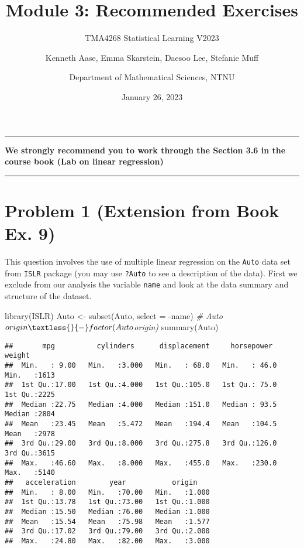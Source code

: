 \documentclass[
]{article}
\title{Module 3: Recommended Exercises}
\subtitle{TMA4268 Statistical Learning V2023}
\author{Kenneth Aase, Emma Skarstein, Daesoo Lee, Stefanie
Muff \and Department of Mathematical Sciences, NTNU}
\date{January 26, 2023}
\newenvironment{Shaded}{\begin{snugshade}}{\end{snugshade}}
\newcommand{\AttributeTok}[1]{\textcolor[rgb]{0.77,0.63,0.00}{#1}}
\newcommand{\CommentTok}[1]{\textcolor[rgb]{0.56,0.35,0.01}{\textit{#1}}}
\newcommand{\FunctionTok}[1]{\textcolor[rgb]{0.00,0.00,0.00}{#1}}
\newcommand{\NormalTok}[1]{#1}
\newcommand{\OtherTok}[1]{\textcolor[rgb]{0.56,0.35,0.01}{#1}}
\newcommand{\SpecialCharTok}[1]{\textcolor[rgb]{0.00,0.00,0.00}{#1}}
\begin{document}
\maketitle

\begin{center}\rule{0.5\linewidth}{0.5pt}\end{center}

\textbf{We strongly recommend you to work through the Section 3.6 in the
course book (Lab on linear regression)}

\begin{center}\rule{0.5\linewidth}{0.5pt}\end{center}

\hypertarget{problem-1-extension-from-book-ex.-9}{%
\section{Problem 1 (Extension from Book Ex.
9)}\label{problem-1-extension-from-book-ex.-9}}

This question involves the use of multiple linear regression on the
\texttt{Auto} data set from \texttt{ISLR} package (you may use
\texttt{?Auto} to see a description of the data). First we exclude from
our analysis the variable \texttt{name} and look at the data summary and
structure of the dataset.

\begin{Shaded}
\begin{Highlighting}[]
\FunctionTok{library}\NormalTok{(ISLR)}
\NormalTok{Auto }\OtherTok{\textless{}{-}} \FunctionTok{subset}\NormalTok{(Auto, }\AttributeTok{select =} \SpecialCharTok{{-}}\NormalTok{name)}
\CommentTok{\# Auto$origin \textless{}{-} factor(Auto$origin)}
\FunctionTok{summary}\NormalTok{(Auto)}
\end{Highlighting}
\end{Shaded}

\begin{verbatim}
##       mpg          cylinders      displacement     horsepower        weight    
##  Min.   : 9.00   Min.   :3.000   Min.   : 68.0   Min.   : 46.0   Min.   :1613  
##  1st Qu.:17.00   1st Qu.:4.000   1st Qu.:105.0   1st Qu.: 75.0   1st Qu.:2225  
##  Median :22.75   Median :4.000   Median :151.0   Median : 93.5   Median :2804  
##  Mean   :23.45   Mean   :5.472   Mean   :194.4   Mean   :104.5   Mean   :2978  
##  3rd Qu.:29.00   3rd Qu.:8.000   3rd Qu.:275.8   3rd Qu.:126.0   3rd Qu.:3615  
##  Max.   :46.60   Max.   :8.000   Max.   :455.0   Max.   :230.0   Max.   :5140  
##   acceleration        year           origin     
##  Min.   : 8.00   Min.   :70.00   Min.   :1.000  
##  1st Qu.:13.78   1st Qu.:73.00   1st Qu.:1.000  
##  Median :15.50   Median :76.00   Median :1.000  
##  Mean   :15.54   Mean   :75.98   Mean   :1.577  
##  3rd Qu.:17.02   3rd Qu.:79.00   3rd Qu.:2.000  
##  Max.   :24.80   Max.   :82.00   Max.   :3.000
\end{verbatim}
\end{document}
